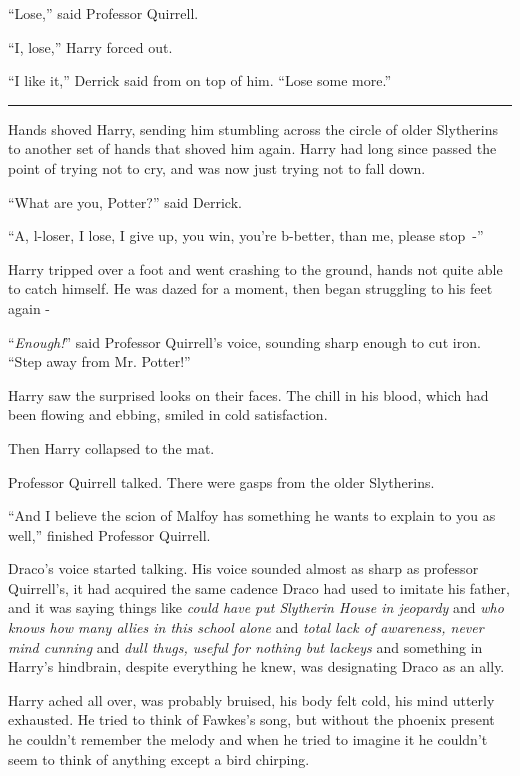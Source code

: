 ``Lose,'' said Professor Quirrell.

``I, lose,'' Harry forced out.

``I like it,'' Derrick said from on top of him. ``Lose some more.''

\begin{center}\rule{3in}{0.4pt}\end{center}

Hands shoved Harry, sending him stumbling across the circle of older Slytherins to another set of hands that shoved him again. Harry had long since passed the point of trying not to cry, and was now just trying not to fall down.

``What are you, Potter?'' said Derrick.

``A, l-loser, I lose, I give up, you win, you're b-better, than me, please stop~-''

Harry tripped over a foot and went crashing to the ground, hands not quite able to catch himself. He was dazed for a moment, then began struggling to his feet again -

``\emph{Enough!}'' said Professor Quirrell's voice, sounding sharp enough to cut iron. ``Step away from Mr. Potter!''

Harry saw the surprised looks on their faces. The chill in his blood, which had been flowing and ebbing, smiled in cold satisfaction.

Then Harry collapsed to the mat.

Professor Quirrell talked. There were gasps from the older Slytherins.

``And I believe the scion of Malfoy has something he wants to explain to you as well,'' finished Professor Quirrell.

Draco's voice started talking. His voice sounded almost as sharp as professor Quirrell's, it had acquired the same cadence Draco had used to imitate his father, and it was saying things like \emph{could have put Slytherin House in jeopardy} and \emph{who knows how many allies in this school alone} and \emph{total lack of awareness, never mind cunning} and \emph{dull thugs, useful for nothing but lackeys} and something in Harry's hindbrain, despite everything he knew, was designating Draco as an ally.

Harry ached all over, was probably bruised, his body felt cold, his mind utterly exhausted. He tried to think of Fawkes's song, but without the phoenix present he couldn't remember the melody and when he tried to imagine it he couldn't seem to think of anything except a bird chirping.

